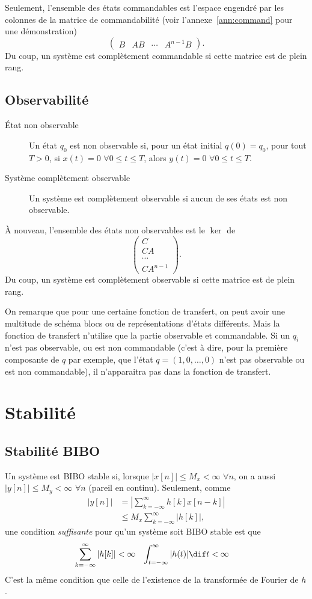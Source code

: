 Seulement, l'ensemble des états commandables est l'espace engendré
par les colonnes de la matrice de commandabilité
(voir l'annexe~\ref{ann:command} pour une démonstration)
\[ \begin{pmatrix}B & AB & \cdots & A^{n-1}B\end{pmatrix}. \]
Du coup, un système est complètement commandable si cette matrice est de
plein rang.


\subsection{Observabilité}
\begin{description}
  \item[État non observable]
    Un état $q_0$ est non observable si,
    pour un état initial $q(0) = q_0$,
    pour tout $T > 0$, si $x(t) = 0$ $\forall 0 \leq t \leq T$, alors
    $y(t) = 0$ $\forall 0 \leq t \leq T$.
  \item[Système complètement observable]
    Un système est complètement observable si aucun de ses états est
    non observable.
\end{description}

À nouveau, l'ensemble des états non observables est le $\ker$ de
\[ \begin{pmatrix}C\\CA\\\cdots\\CA^{n-1}\end{pmatrix}. \]
Du coup, un système est complètement observable si cette matrice est de
plein rang.

On remarque que pour une certaine fonction de transfert,
on peut avoir une multitude de schéma blocs ou de représentations d'états
différents.
Mais la fonction de transfert n'utilise
que la partie observable et commandable.
Si un $q_i$ n'est pas observable, ou est non commandable
(c'est à dire, pour la première composante de $q$ par exemple, que l'état
$q = (1, 0, \ldots, 0)$ n'est pas observable ou est non commandable),
il n'apparaitra pas
dans la fonction de transfert.

\section{Stabilité}
\subsection{Stabilité BIBO}
Un système est BIBO stable si,
lorsque $|x[n]| \leq M_x < \infty$ $\forall n$,
on a aussi $|y[n]| \leq M_y < \infty$ $\forall n$ (pareil en continu).
Seulement, comme
\begin{align*}
  |y[n]| & = \left|\sum_{k=-\infty}^{\infty}h[k]x[n-k]\right|\\
         & \leq M_x \sum_{k=-\infty}^{\infty}|h[k]|,
\end{align*}
une condition \emph{suffisante} pour qu'un système soit BIBO stable est que
\begin{align*}
  \sum_{k=-\infty}^\infty |h[k]| & < \infty &
  \int_{t=-\infty}^\infty |h(t)| \dif t & < \infty
\end{align*}
C'est la même condition que celle de l'existence de la transformée de Fourier
de $h$.

